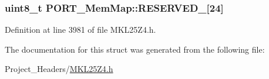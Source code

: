 \subsubsection[{\texorpdfstring{R\+E\+S\+E\+R\+V\+E\+D\+\_\+0}{RESERVED_0}}]{\setlength{\rightskip}{0pt plus 5cm}uint8\+\_\+t P\+O\+R\+T\+\_\+\+Mem\+Map\+::\+R\+E\+S\+E\+R\+V\+E\+D\+\_\mbox{[}24\mbox{]}}\hypertarget{struct_p_o_r_t___mem_map_ad85e48d2b0e879333bf0dcb5a0af21f5}{}\label{struct_p_o_r_t___mem_map_ad85e48d2b0e879333bf0dcb5a0af21f5}


Definition at line 3981 of file M\+K\+L25\+Z4.\+h.



The documentation for this struct was generated from the following file\+:\begin{DoxyCompactItemize}
\item 
Project\+\_\+\+Headers/\hyperlink{_m_k_l25_z4_8h}{M\+K\+L25\+Z4.\+h}\end{DoxyCompactItemize}
